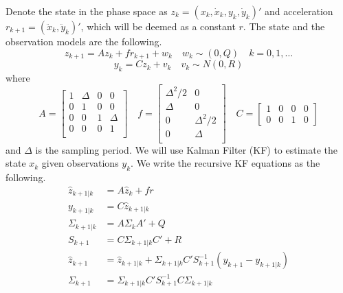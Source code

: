 \documentclass[a4paper, 11pt]{article}
\begin{document}
Denote the state in the phase space as $z_k = (x_k,\dot{x}_k, y_k, \dot{y}_k)'$ and acceleration $r_{k+1} = (\ddot{x}_{k}, \ddot{y}_{k})'$, which will be deemed as a constant $r$. The state and the observation models are the following. 
\begin{equation}
z_{k+1} = Az_k+fr_{k+1}+w_k \quad w_k\sim(0, Q)\quad k=0,1,\dots
\end{equation}
\begin{equation}
y_k = Cz_k+v_k \quad v_k\sim N(0, R)
\end{equation}
where 
\begin{equation}
A = \begin{bmatrix}
1 & \Delta & 0 & 0\\
0& 1 & 0 & 0\\
0 & 0 & 1 & \Delta\\
0 & 0 & 0 & 1\\
\end{bmatrix}\quad f = \begin{bmatrix}
\Delta^2/2 & 0 \\
\Delta & 0 \\
0 & \Delta^2/2 \\
0 & \Delta\\
\end{bmatrix}\quad C = \begin{bmatrix}
1 & 0 & 0 & 0\\
0 & 0& 1 & 0
\end{bmatrix}
\end{equation}
and $\Delta$ is the sampling period. We will use Kalman Filter (KF) to estimate the state $x_k$ given observations $y_k$. We write the recursive KF equations as the following. 
\begin{equation}
\begin{split}
\hat{z}_{k+1|k} & = A\hat{z}_k + fr \\
y_{k+1|k} & = C\hat{z}_{k+1|k} \\
\Sigma_{k+1|k} & = A\Sigma_kA'+Q\\
S_{k+1} & = C\Sigma_{k+1|k}C'+R\\
\hat{z}_{k+1} & = \hat{z}_{k+1|k} + \Sigma_{k+1|k}C'S_{k+1}^{-1}(y_{k+1} - y_{k+1|k})\\
\Sigma_{k+1} & = \Sigma_{k+1|k}C'S_{k+1}^{-1}C\Sigma_{k+1|k}
\end{split}
\end{equation}
\end{document}
